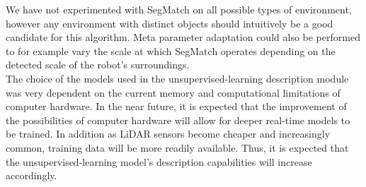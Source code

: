 We have not experimented with SegMatch on all possible types of environment, however any environment with distinct objects should intuitively be a good candidate for this algorithm. Meta parameter adaptation could also be performed to for example vary the scale at which SegMatch operates depending on the detected scale of the robot's surroundings.\\

The choice of the models used in the unsupervised-learning description module was very dependent on the current memory and computational limitations of computer hardware. In the near future, it is expected that the improvement of the possibilities of computer hardware will allow for deeper real-time models to be trained. In addition as LiDAR sensors become cheaper and increasingly common, training data will be more readily available. Thus, it is expected that the unsupervised-learning model's description capabilities will increase accordingly.
